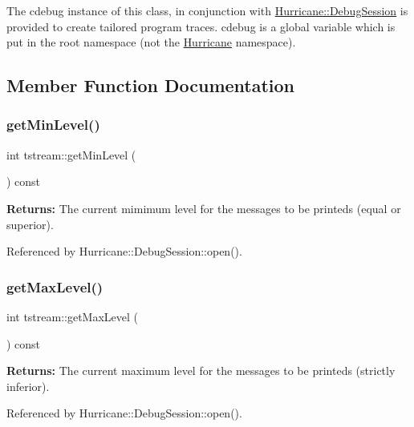 The cdebug instance of this class, in conjunction with \hyperlink{classHurricane_1_1DebugSession}{Hurricane\+::\+Debug\+Session} is provided to create tailored program traces. cdebug is a global variable which is put in the root namespace (not the \hyperlink{namespaceHurricane}{Hurricane} namespace). 

\subsection{Member Function Documentation}
\mbox{\label{clasststream_a86cfc3fc7bfa7d0064d27dea74d6888d}} 
\subsubsection{\texorpdfstring{get\+Min\+Level()}{getMinLevel()}}
{\footnotesize\ttfamily int tstream\+::get\+Min\+Level (\begin{DoxyParamCaption}{ }\end{DoxyParamCaption}) const\hspace{0.3cm}{\ttfamily [inline]}}

{\bfseries Returns\+:} The current mimimum level for the messages to be printeds (equal or superior). 

Referenced by Hurricane\+::\+Debug\+Session\+::open().

\mbox{\label{clasststream_abb7ecc2e0ddeab5442d52acb2ea5fd64}} 
\subsubsection{\texorpdfstring{get\+Max\+Level()}{getMaxLevel()}}
{\footnotesize\ttfamily int tstream\+::get\+Max\+Level (\begin{DoxyParamCaption}{ }\end{DoxyParamCaption}) const\hspace{0.3cm}{\ttfamily [inline]}}

{\bfseries Returns\+:} The current maximum level for the messages to be printeds (strictly inferior). 

Referenced by Hurricane\+::\+Debug\+Session\+::open().

\mbox{\label{clasststream_a0dad8cbc8fc5611b788f55c75a20a88e}} 
